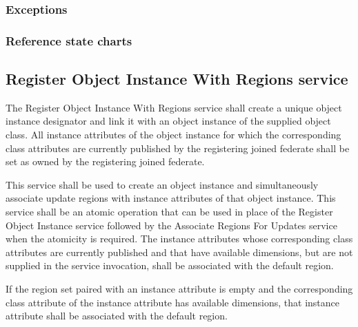 \begin{compactstdpage}

    \subsubsection{Exceptions}


    \subsubsection{Reference state charts}


    \subsection{Register Object Instance With Regions service}

    The Register Object Instance With Regions service shall create a unique object instance designator and link it with an object instance of the supplied object class. All instance attributes of the object instance for which the corresponding class attributes are currently published by the registering joined federate shall be set as owned by the registering joined federate.

    This service shall be used to create an object instance and simultaneously associate update regions with instance attributes of that object instance. This service shall be an atomic operation that can be used in place of the Register Object Instance service followed by the Associate Regions For Updates service when the atomicity is required. The instance attributes whose corresponding class attributes are currently published and that have available dimensions, but are not supplied in the service invocation, shall be associated with the default region.

    If the region set paired with an instance attribute is empty and the corresponding class attribute of the instance attribute has available dimensions, that instance attribute shall be associated with the default region.


\end{compactstdpage}

